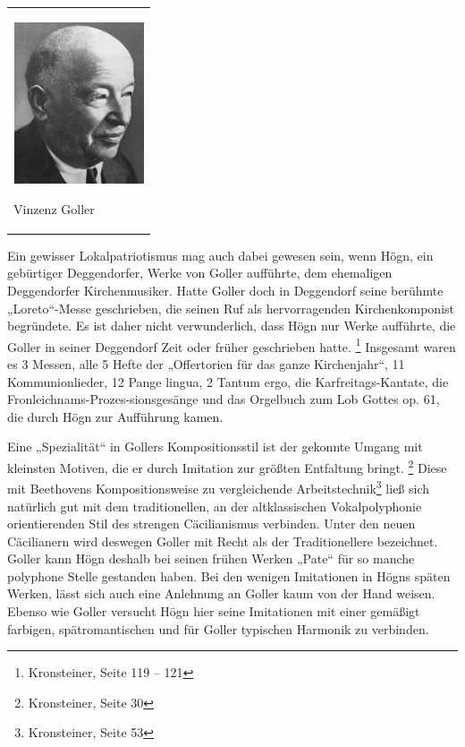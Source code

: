 \begin{center}
\begin{minipage}{4.249cm}
\begin{flushleft}
\tablefirsthead{}
\tablehead{}
\tabletail{}
\tablelasttail{}
\begin{supertabular}{m{4.0490003cm}}

\includegraphics[width=3.866cm,height=4.773cm]{pictures/zulassungsarbeit-img089.jpg}

Vinzenz Goller\\
\end{supertabular}
\end{flushleft}
\end{minipage}
\end{center}
Ein gewisser Lokalpatriotismus mag auch dabei gewesen sein, wenn Högn,
ein gebürtiger Deggendorfer, Werke von Goller aufführte, dem ehemaligen
Deggendorfer Kirchenmusiker. Hatte Goller doch in Deggendorf seine
berühmte „Loreto“-Messe geschrieben, die seinen Ruf als hervorragenden
Kirchenkomponist begründete. Es ist daher nicht verwunderlich, dass
Högn nur Werke aufführte, die Goller in seiner Deggendorf Zeit oder
früher geschrieben hatte. \footnote{Kronsteiner, Seite 119 – 121}
Insgesamt waren es 3 Messen, alle 5 Hefte der „Offertorien für das
ganze Kirchenjahr“, 11 Kommunionlieder, 12 Pange
lingua,\textcolor[rgb]{0.6,0.6,0.6}{ }2 Tantum ergo, die
Karfreitags-Kantate, die Fronleichnams-Prozes-sionsgesänge und das
Orgelbuch zum Lob Gottes op. 61, die durch Högn zur Aufführung kamen.

Eine „Spezialität“ in Gollers Kompositionsstil ist der gekonnte Umgang
mit kleinsten Motiven, die er durch Imitation zur größten Entfaltung
bringt. \footnote{Kronsteiner, Seite 30} Diese mit Beethovens
Kompositionsweise zu vergleichende Arbeitstechnik\footnote{
Kronsteiner, Seite 53} ließ sich natürlich gut mit dem traditionellen,
an der altklassischen Vokalpolyphonie orientierenden Stil des strengen
Cäcilianismus verbinden. Unter den neuen Cäcilianern wird deswegen
Goller mit Recht als der Traditionellere bezeichnet. Goller kann Högn
deshalb bei seinen frühen Werken „Pate“ für so manche polyphone Stelle
gestanden haben. Bei den wenigen Imitationen in Högns späten Werken,
lässt sich auch eine Anlehnung an Goller kaum von der Hand weisen.
Ebenso wie Goller versucht Högn hier seine Imitationen mit einer
gemäßigt farbigen, spätromantischen und für Goller typischen Harmonik
zu verbinden.

